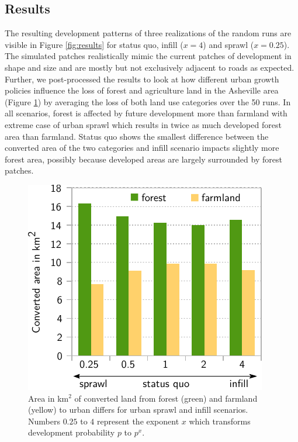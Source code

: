 \documentclass{isprs}
\begin{document}
\subsection{Results}
The resulting development patterns of three realizations of the random runs
are visible in Figure \ref{fig:results}
for status quo, infill ($x = 4$) and sprawl ($x=0.25$).
The simulated patches realistically mimic the current patches of development in shape and size
and are mostly but not exclusively adjacent to roads as expected.
Further, we post-processed the results to look at how different urban growth policies
influence the loss of forest and agriculture land in the Asheville area
(Figure \ref{fig:results_plot})
by averaging the loss of both land use categories over the 50 runs.
In all scenarios, forest is affected by future development more than farmland
with extreme case of urban sprawl which results in twice as much developed forest area than farmland.
Status quo shows the smallest difference between the converted area of the two categories
and infill scenario impacts slightly more forest area, possibly because 
developed areas are largely surrounded by forest patches.


\begin{figure}
 \centering
 \includegraphics[width=0.9\columnwidth]{./figures/converted_land.pdf}
 \caption{Area in km$^2$ of converted land from forest (green) and farmland (yellow) to urban
 differs for urban sprawl and infill scenarios. Numbers $0.25$ to $4$ represent the exponent $x$ which
 transforms development probability $p$ to $p^x$.}
 \label{fig:results_plot}
\end{figure}
\end{document}
